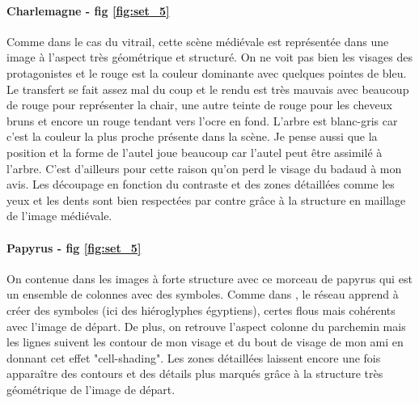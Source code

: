 \documentclass{article}
\begin{document}
\paragraph*{Charlemagne - fig \ref{fig:set_5}} Comme dans le cas du vitrail, cette scène médiévale est représentée dans une image à l'aspect très géométrique et structuré. On ne voit pas bien les visages des protagonistes et le rouge est la couleur dominante avec quelques pointes de bleu. Le transfert se fait assez mal du coup et le rendu est très mauvais avec beaucoup de rouge pour représenter la chair, une autre teinte de rouge pour les cheveux bruns et encore un rouge tendant vers l'ocre en fond. L'arbre est blanc-gris car c'est la couleur la plus proche présente dans la scène. Je pense aussi que la position et la forme de l'autel joue beaucoup car l'autel peut être assimilé à l'arbre. C'est d'ailleurs pour cette raison qu'on perd le visage du badaud à mon avis. Les découpage en fonction du contraste et des zones détaillées comme les yeux et les dents sont bien respectées par contre grâce à la structure en maillage de l'image médiévale.

\paragraph*{Papyrus - fig \ref{fig:set_5}} On contenue dans les images à forte structure avec ce morceau de papyrus qui est un ensemble de colonnes avec des symboles. Comme dans \cite{DBLP:journals/corr/GatysEB15}, le réseau apprend à créer des symboles (ici des hiéroglyphes égyptiens), certes flous mais cohérents avec l'image de départ. De plus, on retrouve l'aspect colonne du parchemin mais les lignes suivent les contour de mon visage et du bout de visage de mon ami en donnant cet effet "cell-shading". Les zones détaillées laissent encore une fois apparaître des contours et des détails plus marqués grâce à la structure très géométrique de l'image de départ.
\end{document}
